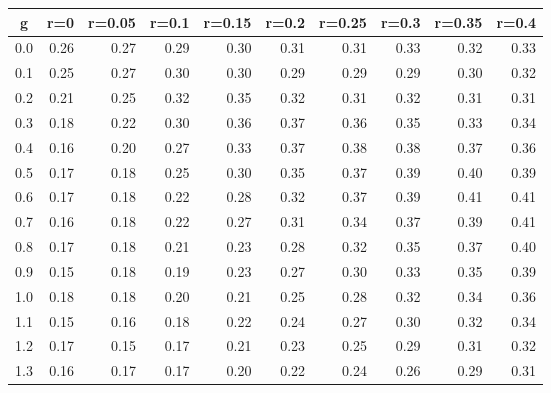 %
\begin{table}[!tbp]
 \begin{center}
 \begin{tabular}{rrrrrrrrrr}\hline\hline
\multicolumn{1}{c}{g}&\multicolumn{1}{c}{r=0}&\multicolumn{1}{c}{r=0.05}&\multicolumn{1}{c}{r=0.1}&\multicolumn{1}{c}{r=0.15}&\multicolumn{1}{c}{r=0.2}&\multicolumn{1}{c}{r=0.25}&\multicolumn{1}{c}{r=0.3}&\multicolumn{1}{c}{r=0.35}&\multicolumn{1}{c}{r=0.4}\tabularnewline
\hline
0.0&0.26&0.27&0.29&0.30&0.31&0.31&0.33&0.32&0.33\tabularnewline
0.1&0.25&0.27&0.30&0.30&0.29&0.29&0.29&0.30&0.32\tabularnewline
0.2&0.21&0.25&0.32&0.35&0.32&0.31&0.32&0.31&0.31\tabularnewline
0.3&0.18&0.22&0.30&0.36&0.37&0.36&0.35&0.33&0.34\tabularnewline
0.4&0.16&0.20&0.27&0.33&0.37&0.38&0.38&0.37&0.36\tabularnewline
0.5&0.17&0.18&0.25&0.30&0.35&0.37&0.39&0.40&0.39\tabularnewline
0.6&0.17&0.18&0.22&0.28&0.32&0.37&0.39&0.41&0.41\tabularnewline
0.7&0.16&0.18&0.22&0.27&0.31&0.34&0.37&0.39&0.41\tabularnewline
0.8&0.17&0.18&0.21&0.23&0.28&0.32&0.35&0.37&0.40\tabularnewline
0.9&0.15&0.18&0.19&0.23&0.27&0.30&0.33&0.35&0.39\tabularnewline
1.0&0.18&0.18&0.20&0.21&0.25&0.28&0.32&0.34&0.36\tabularnewline
1.1&0.15&0.16&0.18&0.22&0.24&0.27&0.30&0.32&0.34\tabularnewline
1.2&0.17&0.15&0.17&0.21&0.23&0.25&0.29&0.31&0.32\tabularnewline
1.3&0.16&0.17&0.17&0.20&0.22&0.24&0.26&0.29&0.31\tabularnewline
\hline
\end{tabular}

\end{center}

\end{table}

